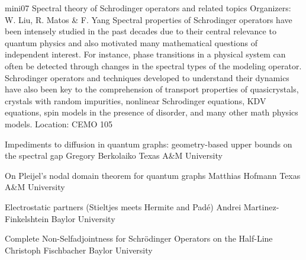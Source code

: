 \mini
{mini07}
{Spectral theory of Schrodinger operators and related topics}
{Organizers: W. Liu, R. Matos \& F. Yang}
{Spectral properties of Schrodinger operators have been intensely studied in the past decades due to their central relevance to quantum physics and also motivated many mathematical questions of independent interest. For instance, phase transitions in a physical system can often be detected through changes in the spectral types of the modeling operator. Schrodinger operators and techniques developed to understand their dynamics have also been key to the comprehension of transport properties of quasicrystals, crystals with random impurities, nonlinear Schrodinger equations, KDV equations, spin models in the presence of disorder, and many other math physics models.}
{Location: CEMO 105}

\begin{talks}
\item\talk
{Impediments to diffusion in quantum graphs: geometry-based upper
bounds on the spectral gap}
{Gregory Berkolaiko}
{Texas A\&M University}
\item\talk
{On Pleijel's nodal domain theorem for quantum graphs}
{Matthias Hofmann}
{Texas A\&M University}
\item\talk
{Electrostatic partners (Stieltjes meets Hermite and Padé)}
{Andrei Martinez-Finkelshtein}
{Baylor University}
\item\talk
{Complete Non-Selfadjointness for Schr\"odinger Operators on the Half-Line}
{Christoph Fischbacher}
{Baylor University}
\end{talks}
\room
